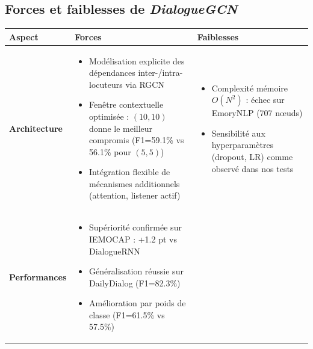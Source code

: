 \documentclass[a4paper,11pt]{article}
\begin{document}
\subsection{Forces et faiblesses de \emph{DialogueGCN}}

\begin{table}[ht]
  \centering
  \begin{tabular}{l p{6cm} p{6cm}}
    \toprule
    \textbf{Aspect} & \textbf{Forces} & \textbf{Faiblesses} \\
    \midrule
    \textbf{Architecture} &
      \begin{minipage}[t]{6cm}
        \begin{itemize}
          \item Modélisation explicite des dépendances inter-/intra-locuteurs via RGCN \cite{ghosal2019dialoguegcn}
          \item Fenêtre contextuelle optimisée : $(10,10)$ donne le meilleur compromis (F1=59.1\% vs 56.1\% pour $(5,5)$)
          \item Intégration flexible de mécanismes additionnels (attention, listener actif)
        \end{itemize}
      \end{minipage}
    &
      \begin{minipage}[t]{6cm}
        \begin{itemize}
          \item Complexité mémoire $O(N^2)$ : échec sur EmoryNLP (707 nœuds) \cite{zhangetal2019memory}
          \item Sensibilité aux hyperparamètres (dropout, LR) comme observé dans nos tests
        \end{itemize}
      \end{minipage}
    \\
    \midrule
    \textbf{Performances} &
      \begin{minipage}[t]{6cm}
        \begin{itemize}
          \item Supériorité confirmée sur IEMOCAP : +1.2 pt vs DialogueRNN \cite{ghosal-etal-2019-dialoguegcn}
          \item Généralisation réussie sur DailyDialog (F1=82.3\%)
          \item Amélioration par poids de classe (F1=61.5\% vs 57.5\%)
        \end{itemize}
      \end{minipage}
    &
      \begin{minipage}[t]{6cm}
        \begin{itemize}

\end{itemize}
\end{minipage}
\end{tabular}
\end{table}
\end{document}
